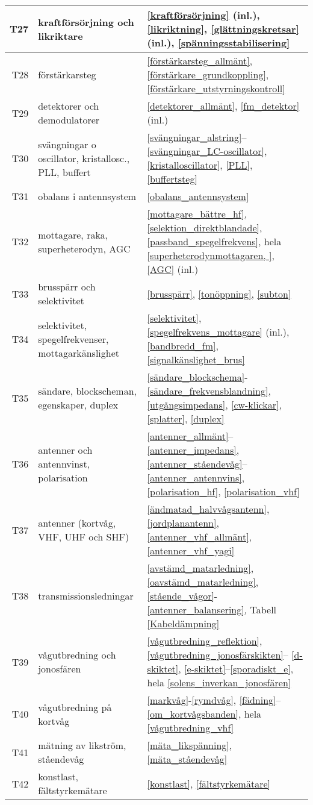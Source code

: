 \begin{table}[H]
\begin{tabular}{rll}
T27 & kraftförsörjning och likriktare &
\ref{kraftförsörjning} (inl.), \ref{likriktning}, \ref{glättningskretsar} (inl.), \ref{spänningsstabilisering}\\ \hline
T28 & förstärkarsteg & 
\ref{förstärkarsteg_allmänt}, \ref{förstärkare_grundkoppling}, 
\ref{förstärkare_utstyrningskontroll}\\ \hline
T29 & detektorer och demodulatorer & 
\ref{detektorer_allmänt}, \ref{fm_detektor} (inl.)\\ \hline
T30 & svängningar o oscillator, kristallosc., PLL, buffert & 
\ref{svängningar_alstring}--\ref{svängningar_LC-oscillator}, 
\ref{kristalloscillator}, \ref{PLL}, \ref{buffertsteg}\\ \hline
T31 & obalans i antennsystem & 
\ref{obalans_antennsystem}\\ \hline
T32 & mottagare, raka, superheterodyn, AGC & 
\ref{mottagare_bättre_hf}, \ref{selektion_direktblandade}, \ref{passband_spegelfrekvens}, 
hela \ref{superheterodynmottagaren, }, \ref{AGC} (inl.)\\ \hline
T33 & brusspärr och selektivitet & 
\ref{brusspärr}, \ref{tonöppning}, \ref{subton}\\ \hline
T34 & selektivitet, spegelfrekvenser, mottagarkänslighet & 
\ref{selektivitet}, \ref{spegelfrekvens_mottagare} (inl.), 
\ref{bandbredd_fm}, \ref{signalkänslighet_brus}\\ \hline 
T35 & sändare, blockscheman, egenskaper, duplex & 
\ref{sändare_blockschema}-\ref{sändare_frekvensblandning}, \ref{utgångsimpedans}, \ref{cw-klickar}, \ref{splatter}, \ref{duplex}\\ \hline
T36 & antenner och antennvinst, polarisation &
\ref{antenner_allmänt}--\ref{antenner_impedans}, 
\ref{antenner_ståendevåg}--\ref{antenner_antennvins}, 
\ref{polarisation_hf}, \ref{polarisation_vhf}\\ \hline
T37 & antenner (kortvåg, VHF, UHF och SHF) &
\ref{ändmatad_halvvågsantenn}, \ref{jordplanantenn}, 
\ref{antenner_vhf_allmänt}, \ref{antenner_vhf_yagi}\\ \hline
T38 & transmissionsledningar & 
\ref{avstämd_matarledning}, \ref{oavstämd_matarledning}, \ref{stående_vågor}-
\ref{antenner_balansering}, Tabell \ref{Kabeldämpning}\\ \hline
T39 & vågutbredning och jonosfären & 
\ref{vågutbredning_reflektion}, \ref{vågutbredning_jonosfärskikten}--
\ref{d-skiktet}, \ref{e-skiktet}--\ref{sporadiskt_e}, hela 
\ref{solens_inverkan_jonosfären}\\ \hline
T40 & vågutbredning på kortvåg &
\ref{markvåg}-\ref{rymdvåg}, \ref{fädning}--\ref{om_kortvågsbanden}, hela \ref{vågutbredning_vhf}\\ \hline
T41 & mätning av likström, ståendevåg & 
\ref{mäta_likspänning}, \ref{mäta_ståendevåg}\\ \hline
T42 & konstlast, fältstyrkemätare & 
\ref{konstlast}, \ref{fältstyrkemätare}\\ \hline 
\end{tabular}
\normalsize
\end{table}

